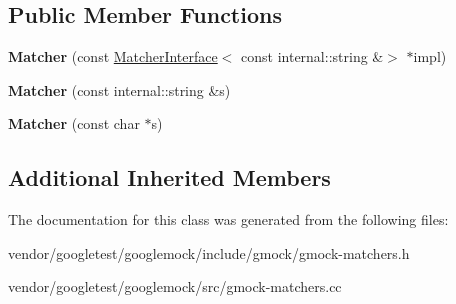 \subsection*{Public Member Functions}
\begin{DoxyCompactItemize}
\item 
\mbox{\label{classtesting_1_1_matcher_3_01const_01internal_1_1string_01_6_4_aa35956335ee37d048c49945b904c1fb9}} 
{\bfseries Matcher} (const \hyperlink{classtesting_1_1_matcher_interface}{Matcher\+Interface}$<$ const internal\+::string \&$>$ $\ast$impl)
\item 
\mbox{\label{classtesting_1_1_matcher_3_01const_01internal_1_1string_01_6_4_a5014c9227335b575a1c0167b9c609bf8}} 
{\bfseries Matcher} (const internal\+::string \&s)
\item 
\mbox{\label{classtesting_1_1_matcher_3_01const_01internal_1_1string_01_6_4_accc8b69db530a019efa2a1d6436eb3db}} 
{\bfseries Matcher} (const char $\ast$s)
\end{DoxyCompactItemize}
\subsection*{Additional Inherited Members}


The documentation for this class was generated from the following files\+:\begin{DoxyCompactItemize}
\item 
vendor/googletest/googlemock/include/gmock/gmock-\/matchers.\+h\item 
vendor/googletest/googlemock/src/gmock-\/matchers.\+cc\end{DoxyCompactItemize}

